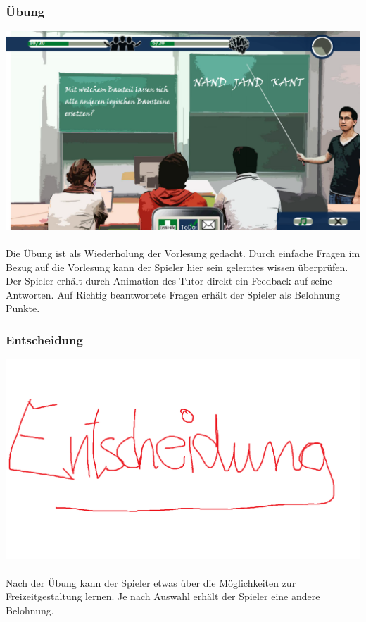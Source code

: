 \documentclass[a4paper, 11pt]{article} %
\begin{document}
\subsubsection{Übung}
\includegraphics[scale=0.46]{images/spiel/uebung.png}\\\\
Die Übung ist als Wiederholung der Vorlesung gedacht. Durch einfache Fragen im Bezug auf die Vorlesung kann der Spieler hier sein gelerntes wissen überprüfen. Der Spieler erhält durch Animation des Tutor direkt ein Feedback auf seine Antworten. Auf Richtig beantwortete Fragen erhält der Spieler als Belohnung Punkte.

\subsubsection{Entscheidung}
\includegraphics[scale=0.46]{images/spiel/entscheidung.png}\\\\
Nach der Übung kann der Spieler etwas über die Möglichkeiten zur Freizeitgestaltung lernen. Je nach Auswahl erhält der Spieler eine andere Belohnung.
\end{document}
